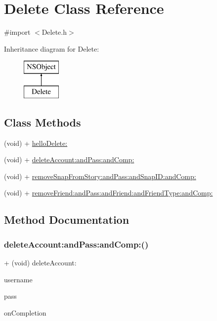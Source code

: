 \hypertarget{interface_delete}{}\section{Delete Class Reference}
\label{interface_delete}


{\ttfamily \#import $<$Delete.\+h$>$}

Inheritance diagram for Delete\+:\begin{figure}[H]
\begin{center}
\leavevmode
\includegraphics[height=2.000000cm]{interface_delete}
\end{center}
\end{figure}
\subsection*{Class Methods}
\begin{DoxyCompactItemize}
\item 
(void) + \hyperlink{interface_delete_a513d95dc95c10c5db1b86e5742515153}{hello\+Delete\+:}
\item 
(void) + \hyperlink{interface_delete_a7fff43de133fdb91027458aca8bac3ec}{delete\+Account\+:and\+Pass\+:and\+Comp\+:}
\item 
(void) + \hyperlink{interface_delete_ae520ec7dd51ee4fa6fa8eaa7399a8757}{remove\+Snap\+From\+Story\+:and\+Pass\+:and\+Snap\+I\+D\+:and\+Comp\+:}
\item 
(void) + \hyperlink{interface_delete_a7dc2f74f32c11ac26dcbed053b7775b9}{remove\+Friend\+:and\+Pass\+:and\+Friend\+:and\+Friend\+Type\+:and\+Comp\+:}
\end{DoxyCompactItemize}


\subsection{Method Documentation}
\hypertarget{interface_delete_a7fff43de133fdb91027458aca8bac3ec}{}\label{interface_delete_a7fff43de133fdb91027458aca8bac3ec} 
\subsubsection{\texorpdfstring{delete\+Account\+:and\+Pass\+:and\+Comp\+:()}{deleteAccount:andPass:andComp:()}}
{\footnotesize\ttfamily + (void) delete\+Account\+: \begin{DoxyParamCaption}\item[{(N\+S\+String $\ast$)}]{username }\item[{andPass:(N\+S\+String $\ast$)}]{pass }\item[{andComp:(void($^\wedge$)(B\+O\+OL, id))}]{on\+Completion }\end{DoxyParamCaption}}

